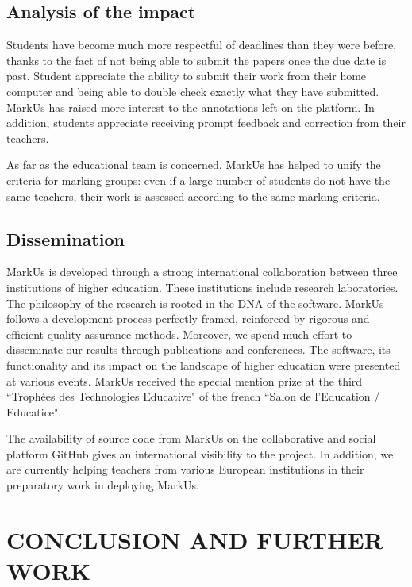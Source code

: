 \documentclass[twocolumn,10pt]{asme2e}
\begin{document}
\subsection*{Analysis of the impact}

Students have become much more respectful of deadlines than they were before, thanks to the fact of not being able to submit the papers once the due date is past. Student appreciate the ability to submit their work from their home computer and being able to double check exactly what they have submitted. MarkUs has raised more interest to the annotations left on the platform. In addition, students appreciate receiving prompt feedback and correction from their teachers.

As far as the educational team is concerned, MarkUs has helped to unify the criteria for marking groups: even if a large number of students do not have the same teachers, their work is assessed according to the same marking criteria. 

\subsection*{Dissemination}

MarkUs is developed through a strong international collaboration between three institutions of higher education. These institutions include research laboratories. The philosophy of the research is rooted in the DNA of the software. MarkUs follows a development process perfectly framed, reinforced by rigorous and efficient quality assurance methods. Moreover, we spend much effort to disseminate our results through publications and conferences. The software, its functionality and its impact on the landscape of higher education were presented at various events. MarkUs received the special mention prize at the third ``Troph\'{e}es des Technologies Educative" of the french ``Salon de l'Education / Educatice". 

The availability of source code from MarkUs on the collaborative and social platform GitHub gives an international visibility to the project. In addition, we are currently helping teachers from various European institutions in their preparatory work in deploying MarkUs.


\section*{CONCLUSION AND FURTHER WORK}
\end{document}

